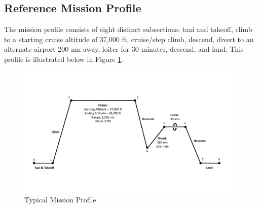 \subsection{Reference Mission Profile}
The mission profile consists of eight distinct subsections: taxi and takeoff, climb to a starting cruise altitude of 37,000 ft, cruise/step climb, descend, divert to an alternate airport 200 nm away, loiter for 30 minutes, descend, and land. This profile is illustrated below in Figure \ref{fig:missionprof}. 

\begin{figure}[!h]
    \centering
    \includegraphics[width=1.0\textwidth]{Photos/Mission_Profile_(2-13-20).pdf}
    \caption{Typical Mission Profile}
    \label{fig:missionprof}
 \end{figure}

